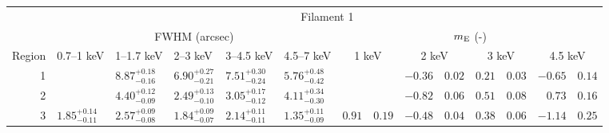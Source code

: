 \begin{tabular}{@{}rlllllr@{ $\pm$ }lr@{ $\pm$ }lr@{ $\pm$ }lr@{ $\pm$ }l@{}}
\toprule
{} & \multicolumn{13}{c}{Filament 1} \\
\cmidrule(l){2-14}
{} & \multicolumn{5}{c}{FWHM (arcsec)} & \multicolumn{8}{c}{$m_\mathrm{E}$ (-)} \\
\cmidrule(lr){2-6} \cmidrule(l){7-14}
Region & 0.7--1 keV & 1--1.7 keV & 2--3 keV & 3--4.5 keV & 4.5--7 keV
       & \multicolumn{2}{c}{1 keV} & \multicolumn{2}{c}{2 keV}
       & \multicolumn{2}{c}{3 keV} & \multicolumn{2}{c}{4.5 keV} \\
\cmidrule{1-14}
1 & {} & ${8.87}^{+0.18}_{-0.16}$ & ${6.90}^{+0.27}_{-0.21}$ & ${7.51}^{+0.30}_{-0.24}$ & ${5.76}^{+0.48}_{-0.42}$
  & \multicolumn{2}{c}{} & $-0.36$ & $0.02$ & $0.21$ & $0.03$ & $-0.65$ & $0.14$ \\
2 & {} & ${4.40}^{+0.12}_{-0.09}$ & ${2.49}^{+0.13}_{-0.10}$ & ${3.05}^{+0.17}_{-0.12}$ & ${4.11}^{+0.34}_{-0.30}$
  & \multicolumn{2}{c}{} & $-0.82$ & $0.06$ & $0.51$ & $0.08$ & $0.73$ & $0.16$ \\
3 & ${1.85}^{+0.14}_{-0.11}$ & ${2.57}^{+0.09}_{-0.08}$ & ${1.84}^{+0.09}_{-0.07}$ & ${2.14}^{+0.11}_{-0.11}$ & ${1.35}^{+0.11}_{-0.09}$
  & $0.91$ & $0.19$ & $-0.48$ & $0.04$ & $0.38$ & $0.06$ & $-1.14$ & $0.25$ \\


\end{tabular}
